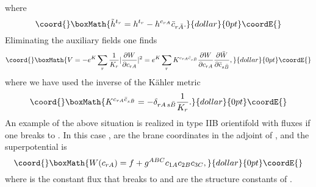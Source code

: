 \documentclass[a4paper,12pt]{article}
\begin{document}
where
$$\coord{}\boxMath{{\tilde h}^{t_r}={ h}^{t_r}-h^{c_{rA}}\bar c_{r\bar A}.}{dollar}{0pt}\coordE{}$$
Eliminating the auxiliary fields one finds
$$\coord{}\boxMath{V=-e^K\sum_r\frac{1}{K_r}|\frac{\partial W}{\partial c_{rA}}|^2=
e^K\sum_rK^{c_{rA}\bar c_{s\bar B}}\frac{\partial W}{\partial
c_{rA}} \frac{\partial \bar W}{\partial \bar c_{s\bar B}},}{dollar}{0pt}\coordE{}$$ where
we have used the inverse of the K\"ahler metric $$\coord{}\boxMath{K^{c_{rA}\bar
c_{s\bar B}}=-\delta_{rA \, s\bar B}\frac 1{K_{r}}.}{dollar}{0pt}\coordE{}$$
\bigskip
An example of the above situation is realized in type IIB
orientifold with fluxes if one breaks \coordHE{} to \coordHE{} \cite{fpo}.
In this case \coordHE{}, \coordHE{} are the brane coordinates in the
adjoint of \coordHE{}, and the superpotential is
$$\coord{}\boxMath{W(c_{rA})=f+g^{ABC}c_{1A}c_{2B}c_{3C},}{dollar}{0pt}\coordE{}$$ where \coordHE{} is the
constant flux that breaks \coordHE{} to \coordHE{} and \coordHE{} are the
structure constants of \coordHE{}.
\end{document}
